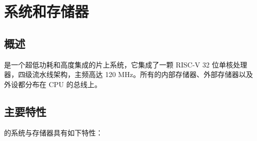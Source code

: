 \documentclass[main\_\_CN.tex]{subfiles}
\begin{document}

\ifglobal
\else
    {\let\clearpage\relax \listoftodos}
    {\let\clearpage\relax \listofdonetodos}
    \tableofcontents
\fi



\hypertarget{sysmem}{}
\chapter{系统和存储器}
\label{mod:sysmem}

\section{概述}

\chipname{} 是一个超低功耗和高度集成的片上系统，它集成了一颗 RISC-V 32 位单核处理器，四级流水线架构，主频高达 120 MHz。所有的内部存储器、外部存储器以及外设都分布在 CPU 的总线上。

\section{主要特性}

\chipname{} 的系统与存储器具有如下特性：
\end{document}
